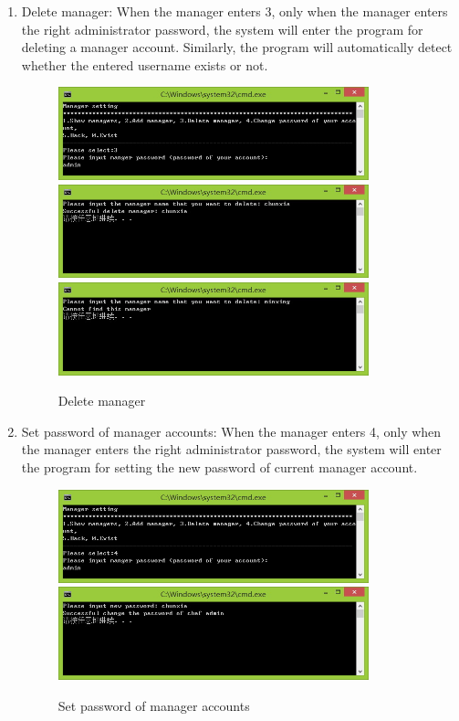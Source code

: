 \documentclass{article}
\begin{document}
\begin{enumerate}
    \item Delete manager:\newline 
    When the manager enters 3, only when the manager enters the right administrator password, the system will enter the program for deleting a manager account. Similarly, the program will automatically detect whether the entered username exists or not.
        \begin{figure}[H]
        \centering
        \includegraphics[width=0.85\textwidth]{C/C3b1.jpg}
        \includegraphics[width=0.85\textwidth]{C/C3b3.jpg}
        \includegraphics[width=0.85\textwidth]{C/C3b2.jpg}
        \caption{Delete manager}
        \end{figure}
    
    \item Set password of manager accounts:\newline 
    When the manager enters 4, only when the manager enters the right administrator password, the system will enter the program for setting the new password of current manager account. 
        \begin{figure}[H]
        \centering
        \includegraphics[width=0.85\textwidth]{C/C4b1.jpg}
        \includegraphics[width=0.85\textwidth]{C/C4b2.jpg}
        \caption{Set password of manager accounts}
        \end{figure}
    

\end{enumerate}
\end{document}
